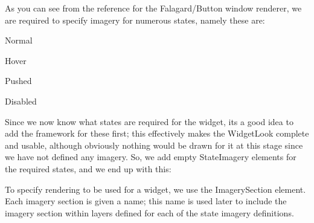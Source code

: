 As you can see from the reference for the Falagard/\+Button window renderer, we are required to specify imagery for numerous states, namely these are\+: \begin{DoxyItemize}
\item {\ttfamily Normal} \item {\ttfamily Hover} \item {\ttfamily Pushed} \item {\ttfamily Disabled} \end{DoxyItemize}
Since we now know what states are required for the widget, it\textquotesingle{}s a good idea to add the framework for these first; this effectively makes the Widget\+Look complete and usable, although obviously nothing would be drawn for it at this stage since we have not defined any imagery. So, we add empty State\+Imagery elements for the required states, and we end up with this\+: 
\begin{DoxyCode}{0}
\DoxyCodeLine{}
\DoxyCodeLine{}
\DoxyCodeLine{}
\DoxyCodeLine{}
\DoxyCodeLine{}
\DoxyCodeLine{}
\end{DoxyCode}


To specify rendering to be used for a widget, we use the Imagery\+Section element. Each imagery section is given a name; this name is used later to \textquotesingle{}include\textquotesingle{} the imagery section within layers defined for each of the state imagery definitions.

